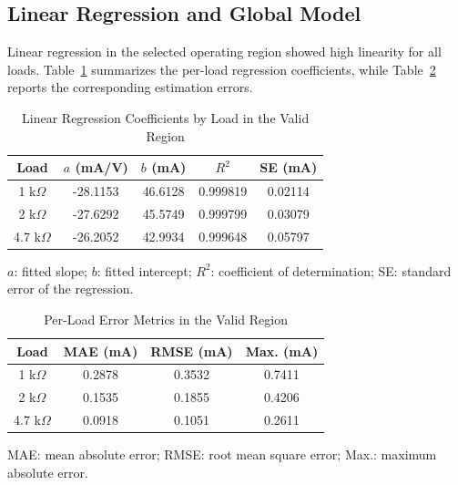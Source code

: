 \documentclass[conference]{IEEEtran}
\begin{document}
\subsection{Linear Regression and Global Model}

Linear regression in the selected operating region showed high linearity for all loads. Table~\ref{tab:load_regression} summarizes the per-load regression coefficients, while Table~\ref{tab:load_error_metrics} reports the corresponding estimation errors.

\begin{table}[!htbp]
\caption{Linear Regression Coefficients by Load in the Valid Region}
\begin{center}
\scriptsize
\renewcommand{\arraystretch}{0.92}
\begin{tabular}{|c|c|c|c|c|}
\hline
\textbf{Load} & \textbf{$a$ (mA/V)} & \textbf{$b$ (mA)} & \textbf{$R^2$} & \textbf{SE (mA)} \\
\hline
1 k$\Omega$ & -28.1153 & 46.6128 & 0.999819 & 0.02114 \\
\hline
2 k$\Omega$ & -27.6292 & 45.5749 & 0.999799 & 0.03079 \\
\hline
4.7 k$\Omega$ & -26.2052 & 42.9934 & 0.999648 & 0.05797 \\
\hline
\end{tabular}
\renewcommand{\arraystretch}{1}
\vspace{1mm}

\parbox{\columnwidth}{\scriptsize $a$: fitted slope; $b$: fitted intercept; $R^2$: coefficient of determination; SE: standard error of the regression.}
\label{tab:load_regression}
\end{center}
\end{table}

\begin{table}[!htbp]
\caption{Per-Load Error Metrics in the Valid Region}
\begin{center}
\scriptsize
\renewcommand{\arraystretch}{0.92}
\begin{tabular}{|c|c|c|c|}
\hline
\textbf{Load} & \textbf{MAE (mA)} & \textbf{RMSE (mA)} & \textbf{Max. (mA)} \\
\hline
1 k$\Omega$ & 0.2878 & 0.3532 & 0.7411 \\
\hline
2 k$\Omega$ & 0.1535 & 0.1855 & 0.4206 \\
\hline
4.7 k$\Omega$ & 0.0918 & 0.1051 & 0.2611 \\
\hline
\end{tabular}
\renewcommand{\arraystretch}{1}
\vspace{1mm}

\parbox{\columnwidth}{\scriptsize MAE: mean absolute error; RMSE: root mean square error; Max.: maximum absolute error.}
\label{tab:load_error_metrics}
\end{center}
\end{table}
\end{document}
